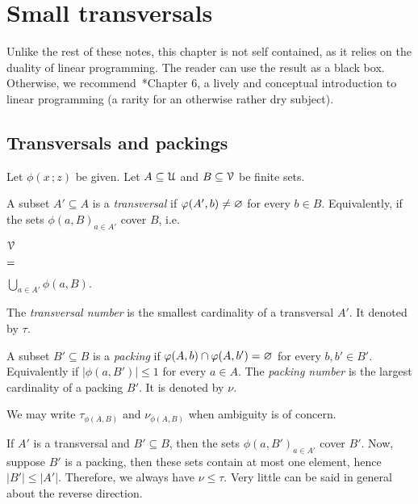\documentclass[scombinatorics.tex]{subfiles}
\begin{document}
\chapter{Small transversals}
\label{fractional}

\def\medrel#1{\parbox[t]{5ex}{$\displaystyle\hfil #1$}}
\def\ceq#1#2#3{\parbox[t]{23ex}{$\displaystyle #1$}\medrel{#2}{$\displaystyle #3$}}
Unlike the rest of these notes, this chapter is not self contained, as it relies on the duality of linear programming.
The reader can use the result as a black box.
Otherwise, we recommend~\cite{LPmatousek}*{Chapter 6}, a lively and conceptual introduction to linear programming (a rarity for an otherwise rather dry subject).

\section{Transversals and packings}\label{Transversals_Packings}

Let $\phi(x\,;z)$ be given. 
Let $A\subseteq\EuScript U$ and $B\subseteq\EuScript V$ be finite sets. 

A subset $A'\subseteq A$ is a \emph{transversal\/} if $\varphi(A',b)\neq\varnothing$ for every $b\in B$. Equivalently, if the sets $\phi(a,B)_{a\in A'}$ cover $B$, i.e.

\ceq{\hfill\V}
{=}
{\bigcup_{a\in A'}\phi(a,B).}

The \emph{transversal number\/} is the smallest cardinality of a transversal $A'$.
It denoted by \emph{$\tau$.} 

A subset $B'\subseteq B$ is a \emph{packing\/} if $\varphi(A,b)\cap\varphi(A,b')=\varnothing$ for every $b,b'\in B'$. Equivalently if $|\phi(a,B')|\le1$ for every $a\in A$.
The \emph{packing number\/} is the largest cardinality of a packing $B'$.
It is denoted by \emph{$\nu$.}

We may write \emph{$\tau_{\phi(A,B)}$} and  \emph{$\nu_{\phi(A,B)}$} when ambiguity is of concern. 

If $A'$ is a transversal and $B'\subseteq B$, then the sets $\phi(a,B')_{a\in A'}$ cover $B'$.
Now, suppose $B'$ is a packing, then these sets contain at most one element, hence $|B'|\le|A'|$.
Therefore, we always have $\nu\le\tau$.
Very little can be said in general about the reverse direction.
\end{document}

